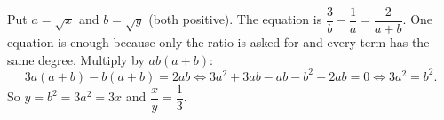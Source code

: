 Put $a=\sqrt x$ and $b=\sqrt y$ (both positive). The equation is $\dfrac{3}{b}-\dfrac{1}{a}=\dfrac{2}{a+b}$. One equation is enough because only the ratio is asked for and every term has the same degree. Multiply by $ab(a+b)$:
\[
3a(a+b)-b(a+b)=2ab\iff 3a^2+3ab-ab-b^2-2ab=0\iff 3a^2=b^2 .
\]
So $y=b^2=3a^2=3x$ and $\dfrac{x}{y}=\boxed{\dfrac{1}{3}}$.
